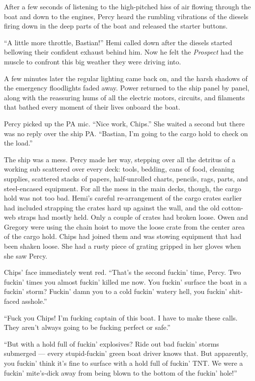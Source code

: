 \documentclass[
]{scrbook}
\begin{document}
After a few seconds of listening to the high-pitched hiss of air flowing
through the boat and down to the engines, Percy heard the rumbling
vibrations of the diesels firing down in the deep parts of the boat and
released the starter buttons.

``A little more throttle, Bastian!'' Hemi called down after the diesels
started bellowing their confident exhaust behind him. Now he felt the
\emph{Prospect} had the muscle to confront this big weather they were
driving into.

A few minutes later the regular lighting came back on, and the harsh
shadows of the emergency floodlights faded away. Power returned to the
ship panel by panel, along with the reassuring hums of all the electric
motors, circuits, and filaments that bathed every moment of their lives
onboard the boat.

Percy picked up the PA mic. ``Nice work, Chips.'' She waited a second
but there was no reply over the ship PA. ``Bastian, I'm going to the
cargo hold to check on the load.''

The ship was a mess. Percy made her way, stepping over all the detritus
of a working sub scattered over every deck: tools, bedding, cans of
food, cleaning supplies, scattered stacks of papers, half-unrolled
charts, pencils, rags, parts, and steel-encased equipment. For all the
mess in the main decks, though, the cargo hold was not too bad. Hemi's
careful re-arrangement of the cargo crates earlier had included
strapping the crates hard up against the wall, and the old cotton-web
straps had mostly held. Only a couple of crates had broken loose. Owen
and Gregory were using the chain hoist to move the loose crate from the
center area of the cargo hold. Chips had joined them and was stowing
equipment that had been shaken loose. She had a rusty piece of grating
gripped in her gloves when she saw Percy.

Chips' face immediately went red. ``That's the second fuckin' time,
Percy. Two fuckin' times you almost fuckin' killed me now. You fuckin'
surface the boat in a fuckin' storm? Fuckin' damn you to a cold fuckin'
watery hell, you fuckin' shit-faced asshole.''

``Fuck you Chips! I'm fucking captain of this boat. I have to make these
calls. They aren't always going to be fucking perfect or safe.''

``But with a hold full of fuckin' explosives? Ride out bad fuckin'
storms submerged --- every stupid-fuckin' green boat driver knows that.
But apparently, you fuckin' think it's fine to surface with a hold full
of fuckin' TNT. We were a fuckin' mite's-dick away from being blown to
the bottom of the fuckin' hole!''
\end{document}
